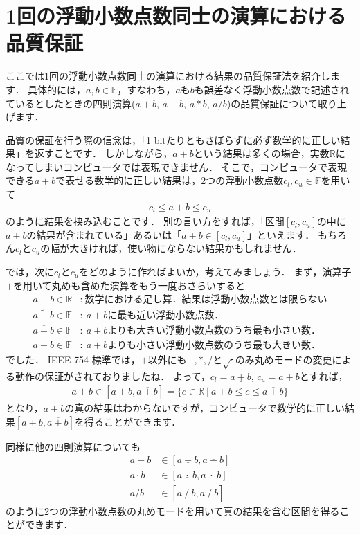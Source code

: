 \section{1回の浮動小数点数同士の演算における品質保証}
ここでは1回の浮動小数点数同士の演算における結果の品質保証法を紹介します．
具体的には，$a, b \in {\mathbb F}$，すなわち，$a$も$b$も誤差なく浮動小数点数で記述されているとしたときの四則演算($a+b$, $a-b$, $a*b$, $a/b$)の品質保証について取り上げます．

品質の保証を行う際の信念は，「1 bitたりともさぼらずに必ず数学的に正しい結果」を返すことです．
しかしながら，$a+b$という結果は多くの場合，実数${\mathbb R}$になってしまいコンピュータでは表現できません．
そこで，コンピュータで表現できる$a+b$で表せる数学的に正しい結果は，2つの浮動小数点数$c_l, c_u \in {\mathbb F}$を用いて
\begin{align*}
	c_l \le a + b \le c_u
\end{align*}
のように結果を挟み込むことです．
別の言い方をすれば，「区間$[c_l, c_u]$の中に$a + b$の結果が含まれている」あるいは「$a + b \in [c_l, c_u]$」といえます．
もちろん$c_l$と$c_u$の幅が大きければ，使い物にならない結果かもしれません．

では，次に$c_l$と$c_u$をどのように作ればよいか，考えてみましょう．
まず，演算子$+$を用いて丸めも含めた演算をもう一度おさらいすると
\begin{align*}
 a + b \in {\mathbb R}&: ~ \mbox{数学における足し算．結果は浮動小数点数とは限らない} \\
 a ~ \tilde{+} ~ b \in {\mathbb F}&: ~ \mbox{$a+b$に最も近い浮動小数点数．} \\
 a ~ \overline{+} ~ b \in {\mathbb F}&: ~ \mbox{$a+b$よりも大きい浮動小数点数のうち最も小さい数．}\\
 a ~ \underline{+} ~ b \in {\mathbb F}&: ~ \mbox{$a+b$よりも小さい浮動小数点数のうち最も大きい数．}
\end{align*}
でした．
IEEE 754 標準では，$+$以外にも$-, *, /$と$\sqrt{\cdot}$のみ丸めモードの変更による動作の保証がされておりましたね．
よって，$c_l = a ~ \underline{+} ~ b$, $c_u = a ~ \overline{+} ~ b$とすれば，
\begin{align*}
	a + b \in [ a ~ \underline{+} ~ b, a ~ \overline{+} ~ b  ] = \{ c \in {\mathbb R} ~ | ~  a ~ \underline{+} ~ b \le c \le a ~ \overline{+} ~ b \}
\end{align*}
となり，$a + b$の真の結果はわからないですが，コンピュータで数学的に正しい結果$[ a ~ \underline{+} ~ b, a ~ \overline{+} ~ b  ]$を得ることができます．

同様に他の四則演算についても
\begin{align*}
	a - b &\in [ a ~ \underline{-} ~ b, a ~ \overline{-} ~ b  ] \\
	a \cdot b &\in [ a ~ \underline{\cdot} ~ b, a ~ \overline{\cdot} ~ b  ] \\
	a / b &\in [ a ~ \underline{/} ~ b, a ~ \overline{/} ~ b  ]
\end{align*}
のように2つの浮動小数点数の丸めモードを用いて真の結果を含む区間を得ることができます．


